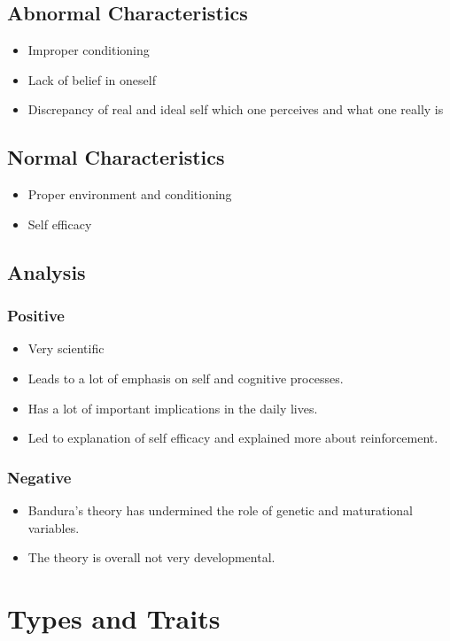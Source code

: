 \documentclass{article}
\begin{document}
		\subsection{Abnormal Characteristics}
			\begin{itemize}
				\item Improper conditioning
				\item Lack of belief in oneself
				\item Discrepancy of real and ideal self which one perceives and what one really is
			\end{itemize}
		\subsection{Normal Characteristics}
			\begin{itemize}
				\item Proper environment and conditioning
				\item Self efficacy
			\end{itemize}
		\subsection{Analysis}
			\subsubsection{Positive}
				\begin{itemize}
					\item Very scientific
					\item Leads to a lot of emphasis on self and cognitive processes.
					\item Has a lot of important implications in the daily lives.
					\item Led to explanation of self efficacy and explained more about reinforcement.
				\end{itemize}
			\subsubsection{Negative}
				\begin{itemize}
					\item Bandura's theory has undermined the role of genetic and maturational variables.
					\item The theory is overall not very developmental.
				\end{itemize}

	\section{Types and Traits}
\end{document}
